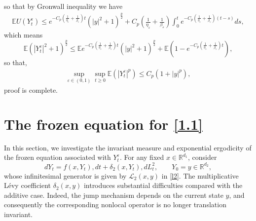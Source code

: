 \documentclass[11pt,reqno]{amsart}
\numberwithin{equation}{section}
\begin{document}
	so that by Gronwall inequality we have 
	\begin{equation}\label{3.21}
		\begin{split}
			\mathbb{E}U(Y_{t}^{\varepsilon})\leq e^{-C_{p}(\frac{1}{\eta_{\varepsilon}}+\frac{1}{\beta_{\varepsilon}})t}(|y|^{2}+1)^{\frac{p}{2}}+C_{p}\left( \frac{1}{\eta_{\varepsilon}}+\frac{1}{\beta_{\varepsilon}}\right) \int^{t}_{0}e^{-C_{p}(\frac{1}{\eta_{\varepsilon}}+\frac{1}{\beta_{\varepsilon}})(t-s)}ds,
		\end{split}\nonumber
	\end{equation}
	which means
	$$\mathbb{E}(|Y_{t}^{\varepsilon}|^{2}+1)^{\frac{p}{2}}\leq \mathbb{E}e^{-C_{p}(\frac{1}{\eta_{\varepsilon}}+\frac{1}{\beta_{\varepsilon}})t}(|y|^{2}+1)^{\frac{p}{2}}+\mathbb{E}(1-e^{-C_{p}(\frac{1}{\eta_{\varepsilon}}+\frac{1}{\beta_{\varepsilon}})t}),$$
	so that,
	\begin{equation}\label{3.22}
		\begin{split}
			\sup\limits_{\varepsilon\in (0,1)}\sup\limits_{t\geq0} \mathbb{E}\left(|Y_{t}^{\varepsilon}|^{p}\right)\leq C_{p}(1+|y|^{p}),
		\end{split}
	\end{equation}
proof is complete.
\fi






\section{The frozen equation for \eqref{1.1}}\label{inv}
In this section, we investigate the invariant measure and exponential ergodicity of the frozen equation associated with $Y^\varepsilon_t$. For any fixed $x\in\mathbb{R}^{d_1}$, consider
\begin{equation}\label{4.1}
dY_t=f(x,Y_t),dt+\delta_2(x,Y_t),dL_t^2,
\qquad
Y_0=y\in\mathbb R^{d_2},
\end{equation}
whose infinitesimal generator is given by $\mathcal{L}_2(x,y)$ in \eqref{l2}.
The multiplicative Lévy coefficient $\delta_2(x,y)$ introduces substantial difficulties compared with the additive case. Indeed, the jump mechanism depends on the current state $y$, and consequently the corresponding nonlocal operator is no longer translation invariant. 
\end{document}
